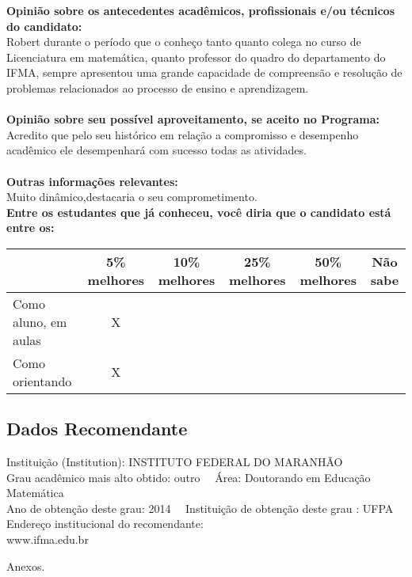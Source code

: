 \documentclass[11pt]{article}
\begin{document}
\textbf{Opinião sobre os antecedentes acadêmicos, profissionais e/ou técnicos do candidato:}
\\Robert durante o período que o conheço tanto quanto colega no curso de Licenciatura em matemática, quanto professor do quadro do departamento do IFMA, sempre apresentou uma grande capacidade de compreensão e resolução de problemas relacionados ao processo de ensino e aprendizagem.\\
\\
\textbf{Opinião sobre seu possível aproveitamento, se aceito no Programa:}
\\Acredito que pelo seu histórico em relação a compromisso e desempenho acadêmico ele desempenhará com sucesso todas as atividades.\\ 
\\
\textbf{Outras informações relevantes:} \\Muito dinâmico,destacaria o seu comprometimento.
\\[0.3cm]
\textbf{Entre os estudantes que já conheceu, você diria que o candidato está entre os:}
\\
\begin{tabular}{|l|c|c|c|c|c|}
\hline
 & 5\% melhores & 10\% melhores & 25\% melhores & 50\% melhores & Não sabe \\
\hline
Como aluno, em aulas & X &  &  &  & \\
\hline
Como orientando & X &  &  &  & \\
\hline
\end{tabular}
\subsection*{Dados Recomendante} 
	Instituição (Institution): INSTITUTO FEDERAL DO MARANHÃO
\\ 
	Grau acadêmico mais alto obtido: outro
	\ \ Área: Doutorando em Educação Matemática
	\\
	Ano de obtenção deste grau: 2014
	\ \ 
	Instituição de obtenção deste grau : UFPA
	\\ 
	Endereço institucional do recomendante: \\ www.ifma.edu.br 
\begin{center}
Anexos.
\end{center}
\end{document}
